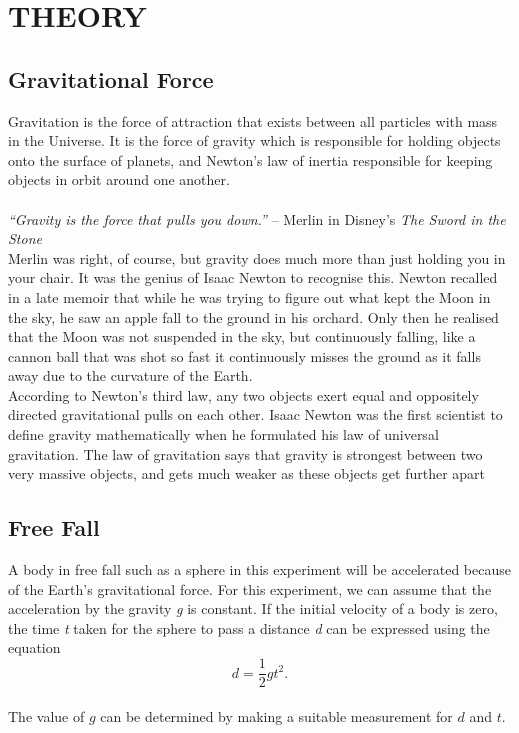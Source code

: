 \documentclass[a4paper,11pt]{article}
\begin{document}
\newpage
{}
\section*{\center THEORY}
\label{sec:THEORY}
\subsection*{Gravitational Force}
Gravitation is the force of attraction that exists between all particles with mass in the Universe. It is the force of gravity which is responsible for holding objects onto the surface of planets, and Newton's law of inertia responsible for keeping objects in orbit around one another.\\
\\
\textit{“Gravity is the force that pulls you down.''} -- Merlin in Disney's \textit{The Sword in the Stone}
\\

Merlin was right, of course, but gravity does much more than just holding you in your
chair. It was the genius of Isaac Newton to recognise this. Newton recalled in a late memoir that 
while he was trying to figure out what kept the Moon in the sky, he saw an apple fall to the 
ground in his orchard. Only then he realised that the Moon was not suspended in the sky, but 
continuously falling, like a cannon ball that was shot so fast it continuously misses the ground 
as it falls away due to the curvature of the Earth. 
\\

According to Newton's third law, any two objects exert equal and oppositely directed
gravitational pulls on each other. Isaac Newton was the first scientist to define gravity 
mathematically when he formulated his law of universal gravitation. The law of gravitation says 
that gravity is strongest between two very massive objects, and gets much weaker as these
objects get further apart

\subsection*{Free Fall}
A body in free fall such as a sphere in this experiment will be accelerated because of the Earth’s
gravitational force. For this experiment, we can assume that the acceleration by the gravity \textit{g} is constant. If the initial velocity of a body is zero, the time \textit{t} taken for the sphere to pass a distance \textit{d} can be expressed using the equation\\
\begin{equation}
d = \frac{1}{2}gt^2.
\end{equation}
\\
The value of \( g \) can be determined by making a suitable measurement for \( d \) and \( t \).
\end{document}

